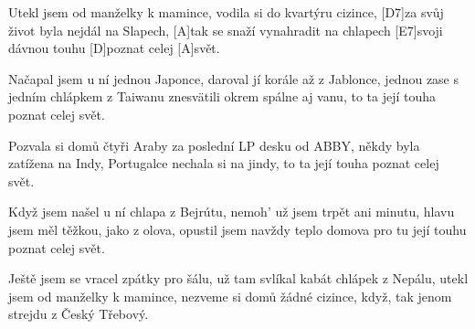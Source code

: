 
\sloka
[A]Utekl jsem od manželky k mamince,
vodila si do kvartýru cizince,
[D7]za svůj život byla nejdál na Slapech,
[A]tak se snaží vynahradit na chlapech
[E7]svoji dávnou touhu [D]poznat celej [A]svět.

\sloka
Načapal jsem u ní jednou Japonce,
daroval jí korále až z Jablonce,
jednou zase s jedním chlápkem z Taiwanu
znesvätili okrem spálne aj vanu,
to ta její touha poznat celej svět.

\sloka
Pozvala si domů čtyři Araby
za poslední LP desku od ABBY,
někdy byla zatížena na Indy,
Portugalce nechala si na jindy,
to ta její touha poznat celej svět.

\sloka
Když jsem našel u ní chlapa z Bejrútu,
nemoh' už jsem trpět ani minutu,
hlavu jsem měl těžkou, jako z olova,
opustil jsem navždy teplo domova
pro tu její touhu poznat celej svět.

\sloka
Ještě jsem se vracel zpátky pro šálu,
už tam svlíkal kabát chlápek z Nepálu,
utekl jsem od manželky k mamince,
nezveme si domů žádné cizince,
když, tak jenom strejdu z Český Třebový.
